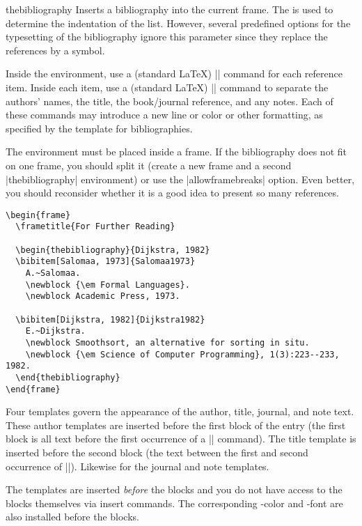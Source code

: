\begin{environment}{{thebibliography}}
  Inserts a bibliography into the current frame. The  is used to determine the indentation of the list. However, several predefined options for the typesetting of the bibliography ignore this parameter since they replace the references by a symbol.

  Inside the environment, use a (standard \LaTeX) |\bibitem| command for each reference item. Inside each item, use a (standard \LaTeX) |\newblock| command to separate the authors' names, the title, the book/journal reference, and any notes. Each of these commands may introduce a new line or color or other formatting, as specified by the template for bibliographies.

  The environment must be placed inside a frame. If the bibliography does not fit on one frame, you should split it (create a new frame and a second |thebibliography| environment) or use the |allowframebreaks| option. Even better, you should reconsider whether it is a good idea to present so many references.

  \example
\begin{verbatim}
\begin{frame}
  \frametitle{For Further Reading}

  \begin{thebibliography}{Dijkstra, 1982}
  \bibitem[Salomaa, 1973]{Salomaa1973}
    A.~Salomaa.
    \newblock {\em Formal Languages}.
    \newblock Academic Press, 1973.

  \bibitem[Dijkstra, 1982]{Dijkstra1982}
    E.~Dijkstra.
    \newblock Smoothsort, an alternative for sorting in situ.
    \newblock {\em Science of Computer Programming}, 1(3):223--233, 1982.
  \end{thebibliography}
\end{frame}
\end{verbatim}

  Four templates govern the appearance of the author, title, journal, and note text. These author templates are inserted before the first block of the entry (the first block is all text before the first occurrence of a |\newblock| command). The title template is inserted before the second block (the text between the first and second occurrence of |\newblock|). Likewise for the journal and note templates.

  The templates are inserted \emph{before} the blocks and you do not have access to the blocks themselves via insert commands. The corresponding \beamer-color and -font are also installed before the blocks.


\end{environment}
